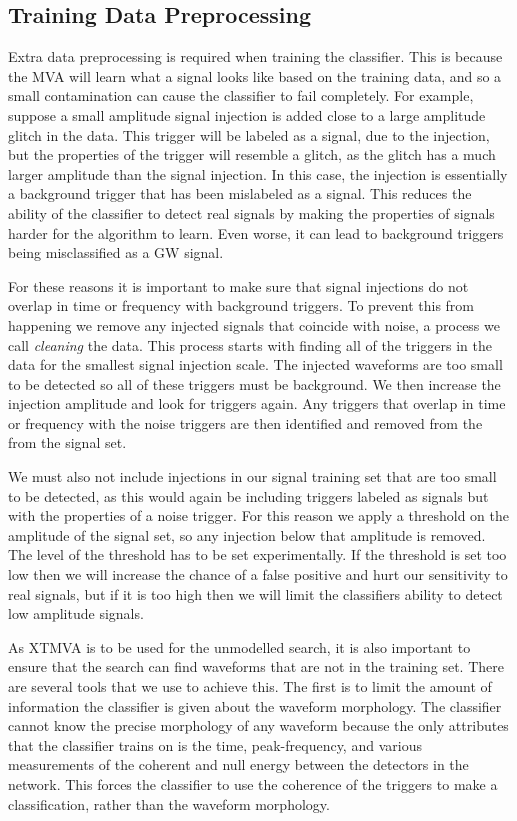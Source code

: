 \documentclass[11pt]{cuthesis}
\begin{document}
\subsection{Training Data Preprocessing}\label{sec:data-preprocessing}
Extra data preprocessing is required when training the classifier. This is because the MVA will learn what a signal looks like based on the training data, and so a small contamination can cause the classifier to fail completely. For example, suppose a small amplitude signal injection is added close to a large amplitude glitch in the data. This trigger will be labeled as a signal, due to the injection, but the properties of the trigger will resemble a glitch, as the glitch has a much larger amplitude than the signal injection. In this case, the injection is essentially a background trigger that has been mislabeled as a signal. This reduces the ability of the classifier to detect real signals by making the properties of signals harder for the algorithm to learn. Even worse, it can lead to background triggers being misclassified as a GW signal.  

For these reasons it is important to make sure that signal injections do not overlap in time or frequency with background triggers. To prevent this from happening we remove any injected signals that coincide with noise, a process we call \textit{cleaning} the data. This process starts with finding all of the triggers in the data for the smallest signal injection scale. The injected waveforms are too small to be detected so all of these triggers must be background. We then increase the injection amplitude and look for triggers again. Any triggers that overlap in time or frequency with the noise triggers are then identified and removed from the from the signal set. 

We must also not include injections in our signal training set that are too small to be detected, as this would again be including triggers labeled as signals but with the properties of a noise trigger. For this reason we apply a threshold on the amplitude of the signal set, so any injection below that amplitude is removed. The level of the threshold has to be set experimentally. If the threshold is set too low then we will increase the chance of a false positive and hurt our sensitivity to real signals, but if it is too high then we will limit the classifiers ability to detect low amplitude signals. 

As XTMVA is to be used for the unmodelled search, it is also important to ensure that the search can find waveforms that are not in the training set. There are several tools that we use to achieve this. The first is to limit the amount of information the classifier is given about the waveform morphology. The classifier cannot know the precise morphology of any waveform because the only attributes that the classifier trains on is the time, peak-frequency, and various measurements of the coherent and null energy between the detectors in the network. This forces the classifier to use the coherence of the triggers to make a classification, rather than the waveform morphology. 
\end{document}
